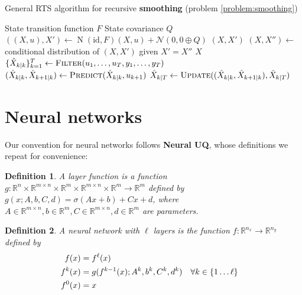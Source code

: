 \documentclass{article} %
\newcommand{\neuralUQ}{{\color{red} \textbf{Neural UQ}}\xspace}
\newtheorem{definition}{Definition}
\DeclareMathOperator{\normal}{\mathrm N}
\begin{document}
\begin{algorithm}
  \caption{
    \label{alg:rts-smoother}
    General RTS algorithm for recursive \textbf{smoothing} (problem
  \ref{problem:smoothing})}
  \begin{algorithmic}[1]
    \Require State transition function \(F\)
    \Require State covariance \(Q\)
    \State
    \(((X, u), X') \gets \normal (\text{id} , F)(X, u) +
    \mathcal{N}(0, 0 \oplus Q)\)
    \State\Return \((X, X')\)
    \EndFunction
    \State
    \((X, X'') \gets\) conditional distribution of
    \((X,X')\) given \(X' = X''\)
    \State\Return \(X\)
    \EndFunction
    \State \(\{\hat X_{k|k}\}_{k=1}^T \gets
    \textsc{Filter}(u_1, \ldots, u_T, y_1, \ldots, y_T)\)
    \State \( (\hat X_{k|k}, \hat X_{k+1|k}) \gets
    \textsc{Predict}(\hat X_{k \mid k}, u_{k+1}) \)
    \State \( \hat X_{k|T} \gets \textsc{Update}((\hat
    X_{k|k}, \hat X_{k+1|k}), \hat X_{k|T}) \)
    \EndFor
    \EndProcedure
  \end{algorithmic}
\end{algorithm}

\section{Neural networks}
Our convention for neural networks follows \neuralUQ, whose definitions we repeat for convenience:

\begin{definition}
    \label{def:layer-function}
    A layer function is a function \(g:\mathbb R^n \times \mathbb R^{m \times n} \times \mathbb R^m \times \mathbb R^{m \times n} \times \mathbb R^m \to \mathbb R^m\) defined by \(g(x; A, b, C, d) = \sigma(A x + b) + C x + d\), where \(A \in \mathbb R^{m \times n}, b \in \mathbb R^m, C \in \mathbb R^{m \times n}, d \in \mathbb R^m\) are parameters.
\end{definition}

\begin{definition}
    \label{def:neural-network}
    A neural network with \(\ell \) layers is the function \(f: \mathbb R^{n_x} \to \mathbb R^{n_y}\) defined by
    \begin{align*}
        f(x) &= f^\ell(x) \\
        f^k(x) &= g(f^{k-1}(x); A^k, b^k, C^k, d^k) & \forall k &\in \cbr{1 \ldots \ell} \\
        f^0(x) &= x
    \end{align*}
\end{definition}
\end{document}

